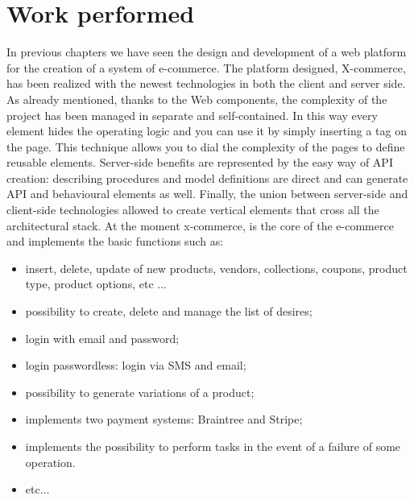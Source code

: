 \section{Work performed}
\label{sec:work_performed}
In previous chapters we have seen the design and development of a web platform for the creation of a system of e-commerce.
\newline
The platform designed, X-commerce, has been realized with the newest technologies in both the client and server side.
\newline
As already mentioned, thanks to the Web components, the complexity of the project has been managed in separate and self-contained. In this way every element hides the operating logic and you can use it by simply inserting a tag on the page. This technique allows you to dial the complexity of the pages to define reusable elements.
\newline
Server-side benefits are represented by the easy way of API creation: describing procedures and model definitions are direct and can generate API and behavioural elements as well.
Finally, the union between server-side and client-side technologies allowed
to create vertical elements that cross all the architectural stack.
At the moment x-commerce, is the core of the e-commerce and implements the basic functions such as:
\begin{itemize}
\item insert, delete, update of new products, vendors, collections, coupons, product type, product options, etc ...
\item possibility to create, delete and manage the list of desires;
\item login with email and password;
\item login passwordless: login via SMS and email;
\item possibility to generate variations of a product;
\item implements two payment systems: Braintree and Stripe;
\item implements the possibility to perform tasks in the event of a failure of some operation.
\item etc...
\end{itemize}